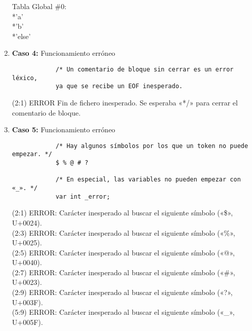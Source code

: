 \documentclass{article}
\begin{document}
\begin{enumerate}
    \begin{tcolorbox}[title={Volcado del fichero de la tabla de símbolos}, colback=white]
        Tabla Global \#0: \\
        *'a' \\
        *'b' \\
        *'else'
    \end{tcolorbox}

    \newpage
    
    \item \textbf{Caso 4:} Funcionamiento erróneo
    \begin{tcolorbox}[title={Código fuente}, colback=white]
        \begin{lstlisting}
            /* Un comentario de bloque sin cerrar es un error léxico, 
            ya que se recibe un EOF inesperado.
        \end{lstlisting}      
    \end{tcolorbox}

    \begin{tcolorbox}[title={Errores detectados}, colback=white]
        (2:1) ERROR Fin de fichero inesperado. Se esperaba «*/» para cerrar el comentario de bloque.
    \end{tcolorbox}

    \vspace{3cm}

    \item \textbf{Caso 5:} Funcionamiento erróneo
    \begin{tcolorbox}[title={Código fuente}, colback=white]
        \begin{lstlisting}
            /* Hay algunos símbolos por los que un token no puede empezar. */
            $ % @ # ?
            
            /* En especial, las variables no pueden empezar con «_». */
            var int _error;
        \end{lstlisting}      
    \end{tcolorbox}

    \begin{tcolorbox}[title={Errores detectados}, colback=white]
        (2:1) ERROR: Carácter inesperado al buscar el siguiente símbolo («\$», U+0024).\\
        (2:3) ERROR: Carácter inesperado al buscar el siguiente símbolo («\%», U+0025).\\
        (2:5) ERROR: Carácter inesperado al buscar el siguiente símbolo («@», U+0040).\\
        (2:7) ERROR: Carácter inesperado al buscar el siguiente símbolo («\#», U+0023).\\
        (2:9) ERROR: Carácter inesperado al buscar el siguiente símbolo («?», U+003F).\\
        (5:9) ERROR: Carácter inesperado al buscar el siguiente símbolo («\_», U+005F).
    \end{tcolorbox}


\end{enumerate}
\end{document}
